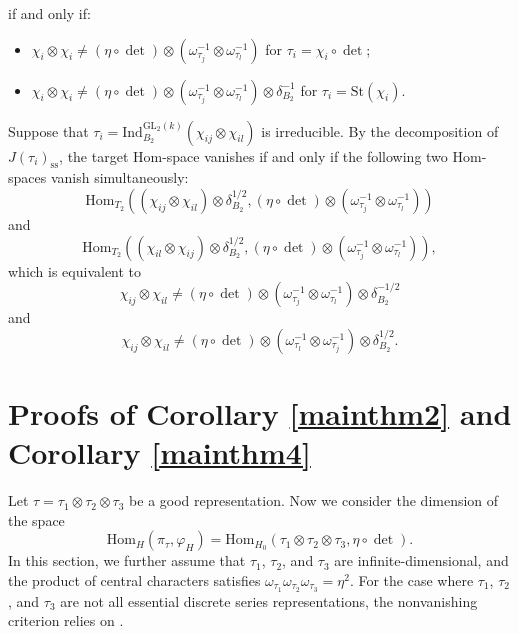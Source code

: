 \documentclass[12pt]{amsart}
\newcommand{\GL}{{\mathrm{GL}}}
\newcommand{\Hom}{{\mathrm{Hom}}}
\newcommand{\Ind}{{\mathrm{Ind}}}
\theoremstyle{Theorem}
\theoremstyle{Theorem}
\theoremstyle{Theorem}
\theoremstyle{Theorem}
\theoremstyle{Plain}
\theoremstyle{remark}
\theoremstyle{remark}
\theoremstyle{Definition}
\begin{document}
if and only if:
\begin{itemize}
    \item $ \chi_i \otimes \chi_i \ne ( \eta \circ \det ) \otimes \left( \omega_{ \tau_j }^{-1} \otimes \omega_{ \tau_l }^{-1} \right) $ for $ \tau_i = \chi_i \circ \det $;
    \item $ \chi_i \otimes \chi_i \ne ( \eta \circ \det ) \otimes \left( \omega_{ \tau_j }^{-1} \otimes \omega_{ \tau_l }^{-1} \right) \otimes \delta_{B_2}^{-1}$ for $ \tau_i = \mathrm{St} ( \chi_i ) $.
\end{itemize}
Suppose that $ \tau_i = \Ind^{ \GL_2(k) }_{B_2} ( \chi_{ij} \otimes \chi_{il} ) $ is irreducible. By the decomposition of $ J( \tau_i )_\mathrm{ss} $, the target Hom-space vanishes if and only if the following two Hom-spaces vanish simultaneously:
\[
    \Hom_{T_2}
    \left(
        ( \chi_{ij} \otimes \chi_{il} ) \otimes \delta_{B_2}^{1/2},( \eta \circ \det ) \otimes \left( \omega_{ \tau_j }^{-1} \otimes \omega_{ \tau_l }^{-1} \right)
    \right)
\]
and
\[
    \Hom_{T_2}
    \left(
        ( \chi_{il} \otimes \chi_{ij} ) \otimes \delta_{B_2}^{1/2}, ( \eta \circ \det ) \otimes \left( \omega_{ \tau_j }^{-1} \otimes \omega_{ \tau_l }^{-1} \right)
    \right),
\]
which is equivalent to 
\[
    \chi_{ij} \otimes \chi_{il} \ne ( \eta \circ \det ) \otimes \left( \omega_{ \tau_j }^{-1} \otimes \omega_{ \tau_l }^{-1} \right) \otimes \delta_{B_2}^{-1/2}
\]
and
\[
    \chi_{ij} \otimes \chi_{il} \ne ( \eta \circ \det ) \otimes \left( \omega_{ \tau_l }^{-1} \otimes \omega_{ \tau_j }^{-1} \right) \otimes \delta_{B_2}^{1/2}.
\]

\section{Proofs of Corollary \ref{mainthm2} and Corollary \ref{mainthm4}}

Let $ \tau = \tau_1 \otimes \tau_2 \otimes \tau_3 $ be a good representation. Now we consider the dimension of the space
\[
    \Hom_H ( \pi_\tau, \varphi_H ) = \Hom_{H_0} \left( \tau_1 \otimes \tau_2 \otimes \tau_3, \eta \circ \det \right).
\]
In this section, we further assume that $\tau_1$, $\tau_2$, and $\tau_3$ are infinite-dimensional, and the product of central characters satisfies $ \omega_{ \tau_1 } \omega_{ \tau_2 } \omega_{ \tau_3 } = \eta^2 $. For the case where $\tau_1$, $\tau_2$, and $\tau_3$ are not all essential discrete series representations, the nonvanishing criterion relies on \cite[Theorem 1.2]{Prasad}.
\end{document}
